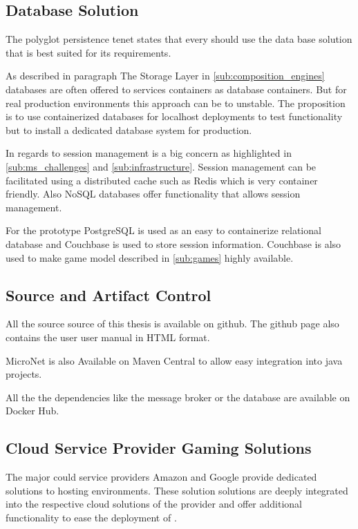 \subsection{Database Solution}
\label{sub:database_solutions}

The polyglot persistence tenet states that every \ms{} should use the data base
solution that is best suited for its requirements.

As described in paragraph The Storage Layer in \autoref{sub:composition_engines}
databases are often offered to services containers as database containers. But
for real production environments this approach can be to
unstable\cite{cazorla2017db_containers}. The proposition is to use containerized
databases for localhost deployments to test functionality but to install a
dedicated database system for production.

In regards to \og{} session management is a big concern as highlighted in
\autoref{sub:ms_challenges} and \autoref{sub:infrastructure}. Session management
can be facilitated using a distributed cache such as Redis which is very
container friendly. Also NoSQL databases offer functionality that allows session
management.

For the prototype PostgreSQL is used as an easy to containerize relational
database and Couchbase is used to store session information. Couchbase is also
used to make game model described in \autoref{sub:games} highly available.

\subsection{Source and Artifact Control}

All the source source of this thesis is available on
github\cite{micronet2017doku}. The github page also contains the user user
manual in HTML format.

MicroNet is also Available on Maven Central to allow easy integration into java
projects.

All the the dependencies like the message broker or the database are available
on Docker Hub.

\subsection{Cloud Service Provider Gaming Solutions}

The major could service providers Amazon and Google provide dedicated solutions
to hosting \og{} environments. These solution solutions are deeply integrated
into the respective cloud solutions of the provider and offer additional
functionality to ease the deployment of \ogs{}.


